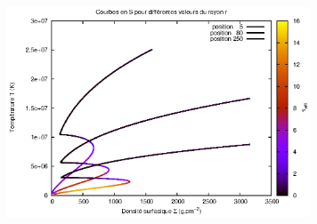 \documentclass[french]{beamer}
\begin{document}

\begin{frame}

   \begin{figure}[htb!]
      \includegraphics[width=9cm]{figures/S_curves_tau.eps}
   \end{figure}
\end{frame}



\end{document}
